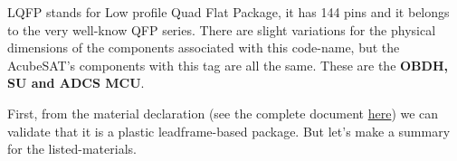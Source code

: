 \documentclass[final]{cubedoc}
\begin{document}
	
	LQFP stands for Low profile Quad Flat Package, it has 144 pins and it belongs to the very well-know QFP series. There are slight variations for the physical dimensions of the components associated with this code-name, but the AcubeSAT's components with this tag are all the same. These are the \textbf{OBDH, SU and ADCS MCU}.
	
	First, from the material declaration (see the complete document \href{https://web.archive.org/web/20200818131830/https://www.st.com/content/ccc/resource/quality_and_reliability/quality_certificate/material_declaration/group3/be/7d/54/2a/11/68/4e/ad/DM00442253/files/P41A_470XXXY_signed.pdf/jcr:content/translations/en.P41A_470XXXY_signed.pdf}{here}) we can validate that it is a plastic leadframe-based package. But let's make a summary for the listed-materials.
	
	
\end{document}
